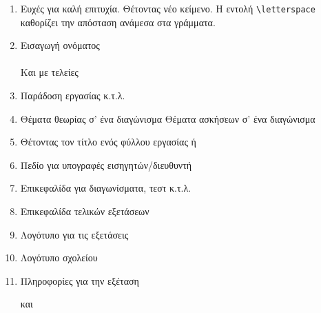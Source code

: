 \documentclass[12pt,a4page]{article}
\begin{document}
\begin{enumerate}
\item Ευχές για καλή επιτυχία.
  \wish
  Θέτοντας νέο κείμενο. Η εντολή \verb/\letterspace/ καθορίζει την απόσταση ανάμεσα στα γράμματα.
  \makeatletter
  \def\schl@wish{\letterspace{10} ΚΑΛΗ ΤΥΧΗ}
  \makeatother
  \wish
\item Εισαγωγή ονόματος\hspace{2em} \fullname\\
  \datefield \\
  Και με τελείες \hspace{3em} \fullname[10]\\ \datefield[10]
\item Παράδοση εργασίας κ.τ.λ. \hspace{3em} \\
\item Θέματα θεωρίας σ' ένα διαγώνισμα \theorypart
  Θέματα ασκήσεων σ' ένα διαγώνισμα \exercisepart
\item Θέτοντας τον τίτλο ενός φύλλου εργασίας
  \worksheettitle{}
  ή
\item Πεδίο για υπογραφές εισηγητών/διευθυντή\\
  \hfill
\item Επικεφαλίδα για διαγωνίσματα, τεστ κ.τ.λ.
  \examtitle{}
\item Επικεφαλίδα τελικών εξετάσεων
\item Λογότυπο για τις εξετάσεις
\item Λογότυπο σχολείου\\ \schoollogo{100pt}
\item Πληροφορίες για την εξέταση\\
  \hfill{}

  και


\end{enumerate}
\end{document}
